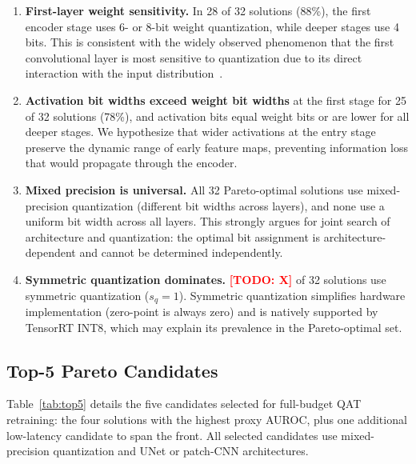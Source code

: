 \documentclass[journal]{IEEEtran}
\newcommand{\TODO}[1]{\textcolor{red}{\textbf{[TODO: #1]}}}
\begin{document}
\begin{enumerate}

\item \textbf{First-layer weight sensitivity.}
In 28 of 32 solutions (88\%), the first encoder stage uses 6- or 8-bit
weight quantization, while deeper stages use 4 bits.
This is consistent with the widely observed phenomenon that the first
convolutional layer is most sensitive to quantization due to its direct
interaction with the input distribution~\cite{dong2019hawq}.

\item \textbf{Activation bit widths exceed weight bit widths} at the first
stage for 25 of 32 solutions (78\%), and activation bits equal weight
bits or are lower for all deeper stages.
We hypothesize that wider activations at the entry stage preserve the
dynamic range of early feature maps, preventing information loss that
would propagate through the encoder.

\item \textbf{Mixed precision is universal.}
All 32 Pareto-optimal solutions use mixed-precision quantization
(different bit widths across layers), and none use a uniform bit width
across all layers.
This strongly argues for joint search of architecture and quantization:
the optimal bit assignment is architecture-dependent and cannot be
determined independently.

\item \textbf{Symmetric quantization dominates.}
\TODO{X} of 32 solutions use symmetric quantization ($s_q = 1$).
Symmetric quantization simplifies hardware implementation (zero-point is
always zero) and is natively supported by TensorRT INT8, which may explain
its prevalence in the Pareto-optimal set.

\end{enumerate}

\subsection{Top-5 Pareto Candidates}
\label{sec:top5}

Table~\ref{tab:top5} details the five candidates selected for full-budget
QAT retraining: the four solutions with the highest proxy AUROC, plus one
additional low-latency candidate to span the front.
All selected candidates use mixed-precision quantization and UNet or
patch-CNN architectures.
\end{document}
